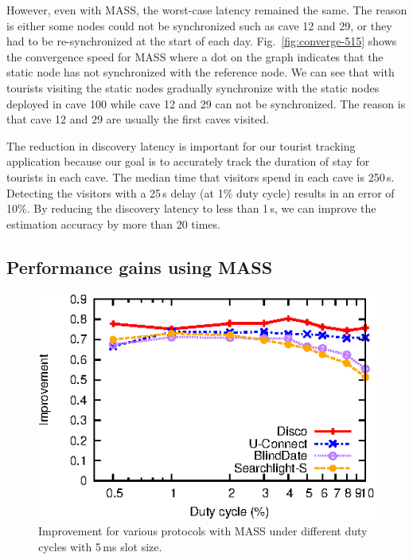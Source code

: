 \documentclass[twoside,twocolumn]{article}
\begin{document}
However, even with MASS, the worst-case latency remained the same.
The reason is either some nodes could not be synchronized such as
cave 12 and 29, or they had to be re-synchronized at the start of 
each day. Fig.~\ref{fig:converge-515} shows the convergence speed
for MASS where a dot on the graph indicates that the static node
has not synchronized with the reference node. We can see that with
tourists visiting the static nodes gradually synchronize with the
static nodes deployed in cave 100 while cave 12 and 29 can not be
synchronized. The reason is that cave 12 and 29 are usually the 
first caves visited.

The reduction in discovery latency is important for our tourist
tracking application because our goal is to accurately track the
duration of stay for tourists in each cave. The median time that
visitors spend in each cave is 250\,s. Detecting the visitors with a
25\,s delay (at 1\% duty cycle) results in an error of 10\%. By
reducing the discovery latency to less than 1\,s, we can improve the
estimation accuracy by more than 20 times.

\subsection{Performance gains using MASS}

\begin{figure}[t]
   \centering
   \includegraphics{graphs/protocols_improvement/improve}
   \caption{Improvement for various protocols with MASS
      under different duty cycles with 5\,ms slot size.}
   \label{fig:improve}
\end{figure}
\end{document}
